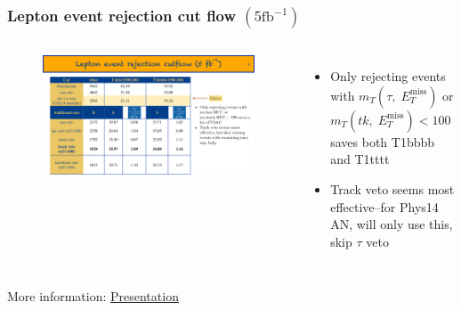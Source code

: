 \documentclass{beamer}
\begin{document}
\begin{frame}
  \frametitle{Lepton event rejection cut flow $(5\mathrm{fb}^{-1})$}
  \begin{columns}[c] %
    \begin{figure}[h]
      \centering
      \includegraphics[width=\textwidth]{figures/jacks_Studies/cutflow_baseline}
    \end{figure}
    \begin{itemize}
    \item Only rejecting events with $m_T(\tau,\;
      E_{T}^{\mathrm{miss}})$ or $m_T(tk,\; E_{T}^{\mathrm{miss}}) <
      100$ saves both T1bbbb and T1tttt
    \item Track veto seems most effective--for Phys14 AN, will only use
      this, skip $\tau$ veto
    \end{itemize}
  \end{columns}
  \vskip1cm
  \centering
\small More information: \href{https://indico.cern.ch/event/360072/contribution/0/material/slides/0.pdf}{Presentation}
\end{frame}
\end{document}
